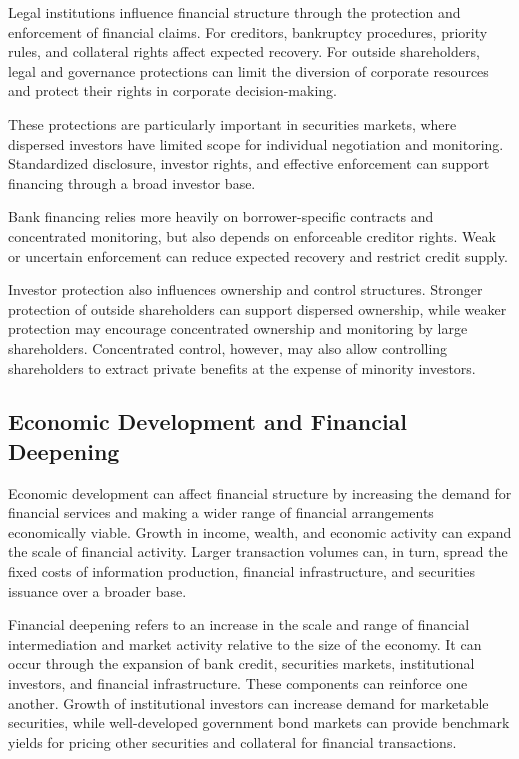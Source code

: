 Legal institutions influence financial structure through the protection and enforcement of financial claims. For creditors, bankruptcy procedures, priority rules, and collateral rights affect expected recovery. For outside shareholders, legal and governance protections can limit the diversion of corporate resources and protect their rights in corporate decision-making.

These protections are particularly important in securities markets, where dispersed investors have limited scope for individual negotiation and monitoring. Standardized disclosure, investor rights, and effective enforcement can support financing through a broad investor base.

Bank financing relies more heavily on borrower-specific contracts and concentrated monitoring, but also depends on enforceable creditor rights. Weak or uncertain enforcement can reduce expected recovery and restrict credit supply.

Investor protection also influences ownership and control structures. Stronger protection of outside shareholders can support dispersed ownership, while weaker protection may encourage concentrated ownership and monitoring by large shareholders. Concentrated control, however, may also allow controlling shareholders to extract private benefits at the expense of minority investors.

\subsection{Economic Development and Financial Deepening}

Economic development can affect financial structure by increasing the demand for financial services and making a wider range of financial arrangements economically viable. Growth in income, wealth, and economic activity can expand the scale of financial activity. Larger transaction volumes can, in turn, spread the fixed costs of information production, financial infrastructure, and securities issuance over a broader base.

Financial deepening refers to an increase in the scale and range of financial intermediation and market activity relative to the size of the economy. It can occur through the expansion of bank credit, securities markets, institutional investors, and financial infrastructure. These components can reinforce one another. Growth of institutional investors can increase demand for marketable securities, while well-developed government bond markets can provide benchmark yields for pricing other securities and collateral for financial transactions.

